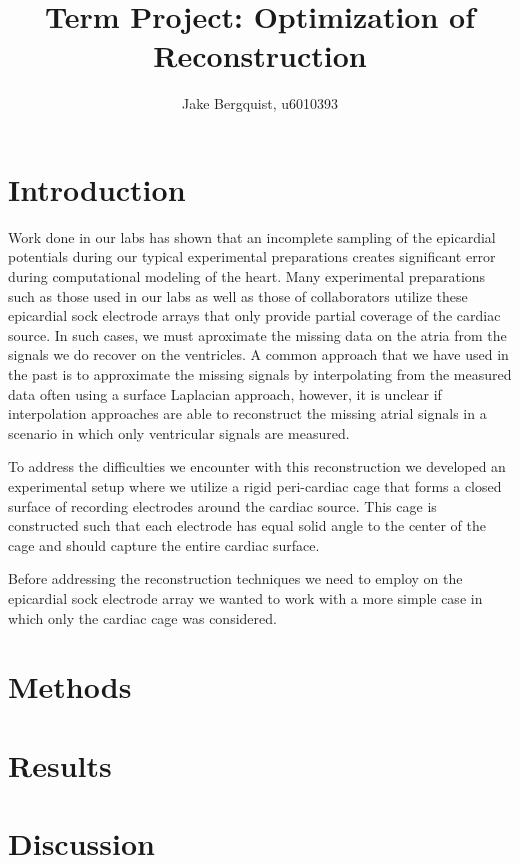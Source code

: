 \documentclass[12pt]{article}
\begin{document}
\title{Term Project: Optimization of Reconstruction}
\author{Jake Bergquist, u6010393 }
\maketitle

\section{Introduction}
Work done in our labs has shown that an incomplete sampling of the epicardial
potentials during our typical experimental preparations creates significant error
during computational modeling of the heart.\cite{RSM:Tat2018b} Many experimental preparations such as those used in our labs as well as those of collaborators utilize these epicardial sock electrode arrays that only provide partial coverage of the cardiac source.\cite{RSM:Bur2018b,Zenger2019,RSM:Goo2018,RSM:Bea2015a} In such
cases, we must aproximate the missing data on the atria from the signals we do recover on the ventricles. A
common approach that we have used in the past is to approximate the missing signals by interpolating from the
measured data often using a surface Laplacian approach, however, it is
unclear if interpolation approaches are able to reconstruct the missing
atrial signals in a scenario in which only ventricular signals are
measured.\cite{Huiskamp1991}

To address the difficulties we encounter with this reconstruction we developed an experimental setup where we utilize a rigid peri-cardiac cage that forms a closed surface of recording electrodes around the cardiac source. This cage is constructed such that each electrode has equal solid angle to the center of the cage and should capture the entire cardiac surface.

Before addressing the reconstruction techniques we need to employ on  the epicardial sock electrode array we wanted to work with a more simple case in which only the cardiac cage was considered. 

\section{Methods}


\section{Results}




\section{Discussion}




\end{document}
